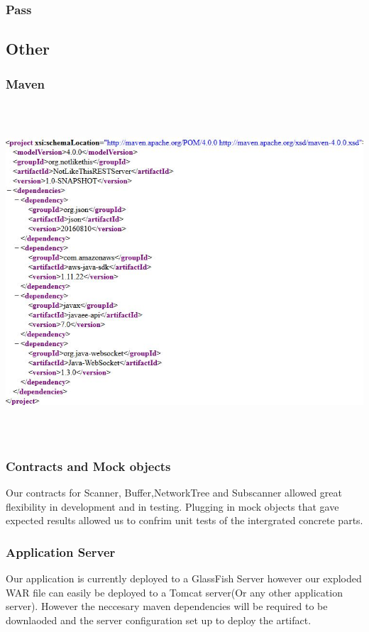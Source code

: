 \documentclass[hidelinks,a4paper,12pt]{article}
\begin{document}
\subsubsection{Pass}

\subsection{Other}
\subsubsection{Maven}
\includegraphics[width=17.3cm,height=12.5cm]{./images/maven.jpg}
\subsubsection{Contracts and Mock objects}
Our contracts for  Scanner, Buffer,NetworkTree and Subscanner allowed great flexibility  in development and in testing. Plugging in mock objects that gave expected results allowed us to confrim unit tests of the intergrated concrete parts.
\subsubsection{Application Server}
Our application is currently deployed to a GlassFish Server however our exploded WAR file can easily be deployed to a Tomcat server(Or any other application server). However the neccesary maven dependencies will be required to be downlaoded and the server configuration set up to deploy the artifact.
\end{document}
